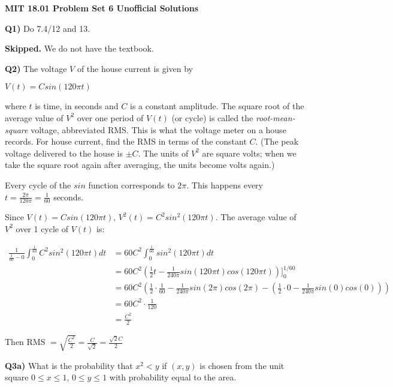 \documentclass[9pt]{article}
\begin{document}
\begin{center}
  \large\textbf{MIT 18.01 Problem Set 6 Unofficial Solutions}
\end{center}

\begin{tcolorbox}
  \textbf{Q1)} Do 7.4/12 and 13.
\end{tcolorbox}

\textbf{Skipped.} We do not have the textbook.


\begin{tcolorbox}
  \textbf{Q2)} The voltage $V$ of the house current is given by\\
  \begin{center}
    $V(t) = Csin(120\pi t)$
  \end{center}
  where $t$ is time, in seconds and $C$ is a constant amplitude. The square root of the average value of $V^2$ over one period of $V(t)$ (or cycle) is called the \emph{root-mean-square} voltage, abbreviated RMS. This is what the voltage meter on a house records. For house current, find the RMS in terms of the constant $C$. (The peak voltage delivered to the house is $\pm C$. The units of $V^2$ are square volts; when we take the square root again after averaging, the units become volts again.)
\end{tcolorbox}

Every cycle of the $sin$ function corresponds to $2 \pi$. This happens every $t = \frac{2 \pi}{120 \pi} = \frac{1}{60}$ seconds.

Since $V(t) = Csin(120\pi t)$, $V^2(t) = C^2 sin^2(120\pi t)$. The average value of $V^2$ over 1 cycle of $V(t)$ is:

\begin{align*}
  \frac{1}{\frac{1}{60} - 0} \int_0^{\frac{1}{60}} C^2 sin^2(120\pi t) dt &= 60C^2 \int_0^{\frac{1}{60}} sin^2(120\pi t) dt \\
  &= 60C^2(\frac{1}{2}t - \frac{1}{240\pi} sin(120\pi t) cos(120\pi t)) \bigg]_0^{1/60} \\
  &= 60C^2(\frac{1}{2} \cdot \frac{1}{60} - \frac{1}{240\pi} sin(2\pi) cos(2\pi) - (\frac{1}{2} \cdot 0 - \frac{1}{240\pi} sin(0) cos(0))) \\
  &= 60C^2 \cdot \frac{1}{120} \\
  &= \frac{C^2}{2}
\end{align*}

Then RMS $= \sqrt{\frac{C^2}{2}} = \frac{C}{\sqrt{2}} = \frac{\sqrt{2}C}{2}$


\begin{tcolorbox}
  \textbf{Q3a)} What is the probability that $x^2 < y$ if $(x, y)$ is chosen from the unit square $0 \leq x \leq 1$, $0 \leq y \leq 1$ with probability equal to the area.
\end{tcolorbox}
\end{document}

